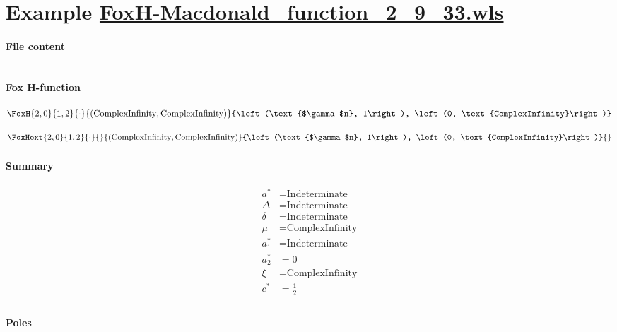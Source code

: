 \documentclass[11pt]{article}
\begin{document}
\section{Example \url{FoxH-Macdonald_function_2_9_33.wls}}

\paragraph{File content}

\inputminted{text}{FoxH-Macdonald_function_2_9_33.wls}

\paragraph{Fox H-function}

\begin{align*}
  \FoxH
    {2,0}
    {1,2}
    {\cdot}
    {\left(\text{ComplexInfinity}, \text{ComplexInfinity}\right)}
    {\left(\text{$\gamma $n}, 1\right), \left(0, \text{ComplexInfinity}\right)}
\end{align*}

\begin{align*}
  \FoxHext
    {2,0}
    {1,2}
    {\cdot}
    {}
    {\left(\text{ComplexInfinity}, \text{ComplexInfinity}\right)}
    {\left(\text{$\gamma $n}, 1\right), \left(0, \text{ComplexInfinity}\right)}
    {}
\end{align*}

\paragraph{Summary}

\begin{align*}
  a^*    & = \text{Indeterminate} \\
  \Delta & = \text{Indeterminate} \\
  \delta & = \text{Indeterminate} \\
  \mu    & = \text{ComplexInfinity} \\
  a_1^*  & = \text{Indeterminate} \\
  a_2^*  & = 0 \\
  \xi    & = \text{ComplexInfinity} \\
  c^*    & = \frac{1}{2} \\
\end{align*}

\paragraph{Poles}
\end{document}
